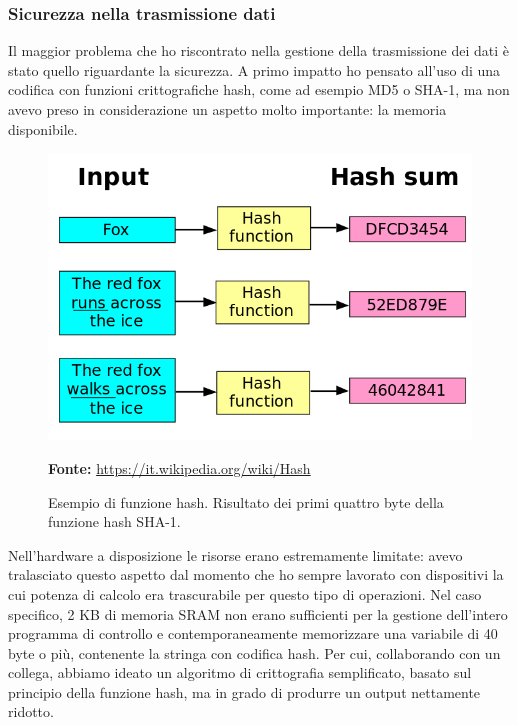 \subsubsection{Sicurezza nella trasmissione dati}
Il maggior problema che ho riscontrato nella gestione della trasmissione dei dati è stato quello riguardante la sicurezza. A primo impatto ho pensato all'uso di una codifica con funzioni crittografiche hash, come ad esempio MD5 o SHA-1, ma non avevo preso in considerazione un aspetto molto importante: la memoria disponibile. 

\begin{figure}[H]
	\begin{center}
	\includegraphics[scale=0.4]{immagini/hash.png}
	\caption{Esempio di funzione hash. Risultato dei primi quattro byte della funzione hash SHA-1.}
	\small{\textbf{Fonte:} \url{https://it.wikipedia.org/wiki/Hash}}
	\end{center}
\end{figure}

Nell'hardware a disposizione le risorse erano estremamente limitate: avevo tralasciato questo aspetto dal momento che ho sempre lavorato con dispositivi la cui potenza di calcolo era trascurabile per questo tipo di operazioni. Nel caso specifico, 2 KB di memoria SRAM non erano sufficienti per la gestione dell'intero programma di controllo e contemporaneamente memorizzare una variabile di 40 byte o più, contenente la stringa con codifica hash. Per cui, collaborando con un collega, abbiamo ideato un algoritmo di crittografia semplificato, basato sul principio della funzione hash, ma in grado di produrre un output nettamente ridotto.


